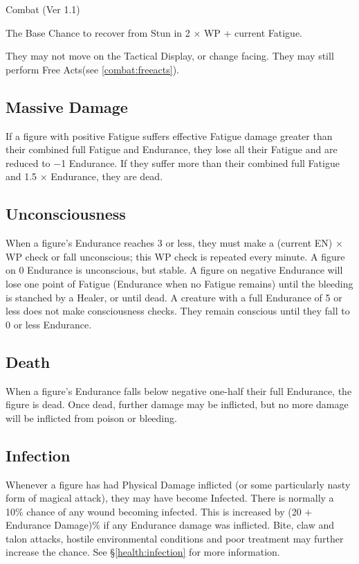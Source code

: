 \begin{Chapter}{Combat (Ver 1.1)}
\begin{Itemize}
\item The Base Chance to recover from Stun in 2 × WP + current
  Fatigue.

\item They may not move on the Tactical Display, or change facing.
  They may still perform Free Acts(see \ref{combat:freeacts}).

\end{Itemize}

\subsection{Massive Damage}

If a figure with positive Fatigue suffers effective Fatigue damage
greater than their combined full Fatigue and Endurance, they lose all
their Fatigue and are reduced to −1 Endurance.  If they suffer more
than their combined full Fatigue and 1.5 × Endurance, they are dead.

\subsection{Unconsciousness}

When a figure’s Endurance reaches 3 or less, they must make a (current
EN) × WP check or fall unconscious; this WP check is repeated every
minute.  A figure on 0 Endurance is unconscious, but stable.  A figure
on negative Endurance will lose one point of Fatigue (Endurance when
no Fatigue remains) until the bleeding is stanched by a Healer, or
until dead. A creature with a full Endurance of 5 or less does not
make consciousness checks.  They remain conscious until they fall to 0
or less Endurance.

\subsection{Death}

When a figure’s Endurance falls below negative one-half their full
Endurance, the figure is dead.  Once dead, further damage may be
inflicted, but no more damage will be inflicted from poison or
bleeding.

\subsection{Infection}

Whenever a figure has had Physical Damage inflicted (or some
particularly nasty form of magical attack), they may have become
Infected.  There is normally a 10\% chance of any wound becoming
infected.  This is increased by (20 + Endurance Damage)\% if any
Endurance damage was inflicted.  Bite, claw and talon attacks, hostile
environmental conditions and poor treatment may further increase the
chance. See \S\ref{health:infection} for more information.


\end{Chapter}

